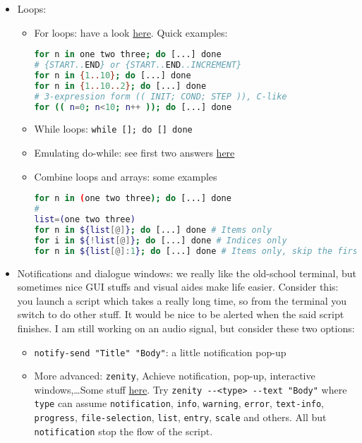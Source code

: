\documentclass[a4paper,12pt,%
              final%
              ]{article}
\begin{document}
\begin{itemize}
  \item Loops:
    \begin{itemize}
      \item For loops: have a look \href{https://www.cyberciti.biz/faq/bash-for-loop/}{here}. Quick examples:
\begin{lstlisting}[language=bash]
for n in one two three; do [...] done
# {START..END} or {START..END..INCREMENT}
for n in {1..10}; do [...] done
for n in {1..10..2}; do [...] done
# 3-expression form (( INIT; COND; STEP )), C-like
for (( n=0; n<10; n++ )); do [...] done
\end{lstlisting}
      \item While loops: \verb|while []; do [] done|
      \item Emulating do-while: see first two answers \href{https://stackoverflow.com/questions/16489809/emulating-a-do-while-loop-in-bash}{here}
      \item Combine loops and arrays: some examples
\begin{lstlisting}[language=bash]
for n in (one two three); do [...] done
#
list=(one two three)
for n in ${list[@]}; do [...] done # Items only
for i in ${!list[@]}; do [...] done # Indices only
for n in ${list[@]:1}; do [...] done # Items only, skip the first
\end{lstlisting}
    \end{itemize}
  \item Notifications and dialogue windows: we really like the old-school terminal, but sometimes nice GUI stuffs and visual aides make life easier. Consider this: you launch a script which takes a really long time, so from the terminal you switch to do other stuff. It would be nice to be alerted when the said script finishes. I am still working on an audio signal, but consider these two options:
    \begin{itemize}
      \item \verb|notify-send "Title" "Body"|: a little notification pop-up
      \item More advanced: \verb|zenity|, Achieve notification, pop-up, interactive windows,\ldots Some stuff \href{https://renenyffenegger.ch/notes/Linux/shell/commands/zenity}{here}. Try \verb|zenity --<type> --text "Body"| where \texttt{type} can assume \texttt{notification}, \texttt{info}, \texttt{warning}, \texttt{error}, \texttt{text-info}, \texttt{progress}, \texttt{file-selection}, \texttt{list}, \texttt{entry}, \texttt{scale} and others. All but \texttt{notification} stop the flow of the script.
        \begin{itemize}

\end{itemize}
\end{itemize}
\end{itemize}
\end{document}
